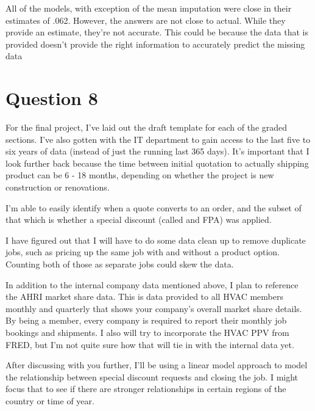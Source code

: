 \documentclass{article}
\begin{document}
All of the models, with exception of the mean imputation were close in their estimates of .062. However, the answers are not close to actual. While they provide an estimate, they're not accurate. This could be because the data that is provided doesn't provide the right information to accurately predict the missing data

\section{Question 8}
For the final project, I've laid out the draft template for each of the graded sections. I've also gotten with the IT department to gain access to the last five to six years of data (instead of just the running last 365 days). It's important that I look further back because the time between initial quotation to actually shipping product can be 6 - 18 months, depending on whether the project is new construction or renovations.

I'm able to easily identify when a quote converts to an order, and the subset of that which is whether a special discount (called and FPA) was applied.

I have figured out that I will have to do some data clean up to remove duplicate jobs, such as pricing up the same job with and without a product option. Counting both of those as separate jobs could skew the data.

In addition to the internal company data mentioned above, I plan to reference the AHRI market share data. This is data provided to all HVAC members monthly and quarterly that shows your company's overall market share details. By being a member, every company is required to report their monthly job bookings and shipments. I also will try to incorporate the HVAC PPV from FRED, but I'm not quite sure how that will tie in with the internal data yet.

After discussing with you further, I'll be using a linear model approach to model the relationship between special discount requests and closing the job. I might focus that to see if there are stronger relationships in certain regions of the country or time of year.
\end{document}

